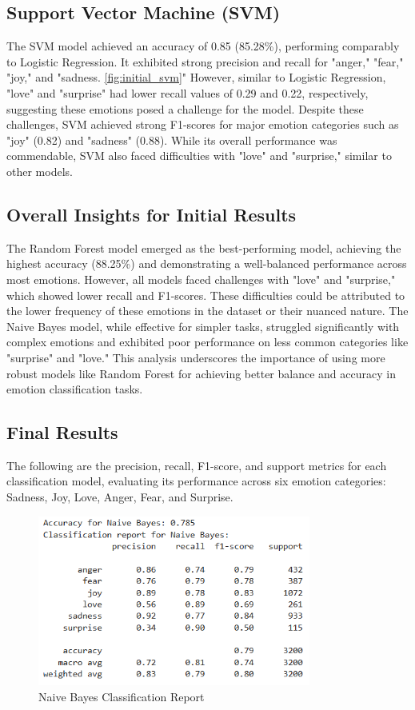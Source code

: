\subsection{Support Vector Machine (SVM)}
The SVM model achieved an accuracy of 0.85 (85.28\%), performing comparably to Logistic Regression. It exhibited strong precision and recall for "anger," "fear," "joy," and "sadness. \ref{fig:initial_svm}" However, similar to Logistic Regression, "love" and "surprise" had lower recall values of 0.29 and 0.22, respectively, suggesting these emotions posed a challenge for the model. Despite these challenges, SVM achieved strong F1-scores for major emotion categories such as "joy" (0.82) and "sadness" (0.88). While its overall performance was commendable, SVM also faced difficulties with "love" and "surprise," similar to other models.

\subsection{Overall Insights for Initial Results}
The Random Forest model emerged as the best-performing model, achieving the highest accuracy (88.25\%) and demonstrating a well-balanced performance across most emotions. However, all models faced challenges with "love" and "surprise," which showed lower recall and F1-scores. These difficulties could be attributed to the lower frequency of these emotions in the dataset or their nuanced nature. The Naive Bayes model, while effective for simpler tasks, struggled significantly with complex emotions and exhibited poor performance on less common categories like "surprise" and "love." This analysis underscores the importance of using more robust models like Random Forest for achieving better balance and accuracy in emotion classification tasks.

       
\subsection{Final Results}
The following are the precision, recall, F1-score, and support metrics for each classification model, evaluating its performance across six emotion categories: Sadness, Joy, Love, Anger, Fear, and Surprise.

\begin{figure}[h!]
\centering
\includegraphics[width=0.8\textwidth]{naive_bayes_result.png}
\caption{Naive Bayes Classification Report}
\label{fig:naive_bayes}
\end{figure}

